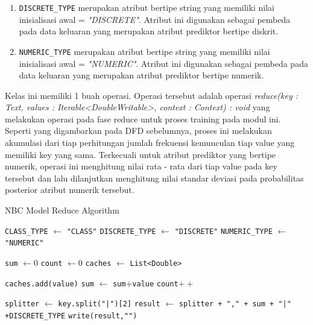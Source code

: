 \begin{enumerate}
\begin{enumerate}
		\item \verb|DISCRETE_TYPE| merupakan atribut bertipe string yang memiliki nilai inisialisasi awal = \textit{"DISCRETE"}. Atribut ini digunakan sebagai pembeda pada data keluaran yang merupakan atribut prediktor bertipe diskrit.

		\item \verb|NUMERIC_TYPE| merupakan atribut bertipe string yang memiliki nilai inisialisasi awal = \textit{"NUMERIC"}. Atribut ini digunakan sebagai pembeda pada data keluaran yang merupakan atribut prediktor bertipe numerik.
	\end{enumerate}
	
	Kelas ini memiliki 1 buah operasi. Operasi tersebut adalah operasi \textit{reduce(key : Text, values : Iterable<DoubleWritable>, context : Context) : void} yang melakukan operasi pada fase reduce untuk proses training pada modul ini. Seperti yang digambarkan pada DFD sebelumnya, proses ini melakukan akumulasi dari tiap perhitungan jumlah frekuensi kemunculan tiap value yang memiliki key yang sama. Terkecuali untuk atribut prediktor yang bertipe numerik, operasi ini menghitung nilai rata - rata dari tiap value pada key tersebut dan lalu dilanjutkan menghitung nilai standar deviasi pada probabilitas posterior atribut numerik tersebut.
	
	
\begin{algorithm}[H]
\caption{NBC Model Reduce Algorithm}\label{alg:NBCGenReduce}
\begin{algorithmic}[1]

\State \verb|CLASS_TYPE| $\gets$ \texttt{"CLASS"}
\State \verb|DISCRETE_TYPE| $\gets$ \texttt{"DISCRETE"}
\State \verb|NUMERIC_TYPE| $\gets$ \texttt{"NUMERIC"}

\State \texttt{sum} $\gets 0$
\State \texttt{count} $\gets 0$
\State \texttt{caches} $\gets$ \texttt{List<Double>}

	\State \texttt{caches.add(value)}
	\State \texttt{sum} $\gets$ \texttt{sum}$+$\texttt{value}
	\State \texttt{count}$++$
\EndFor


\State \texttt{splitter} $\gets$ \texttt{key.split("|")[2]}
\State \texttt{result} $\gets$ \texttt{splitter + "," + sum + "|" +}\verb|DISCRETE_TYPE|
\State \texttt{write(result,"")}



\end{algorithmic}
\end{algorithm}
\end{enumerate}
